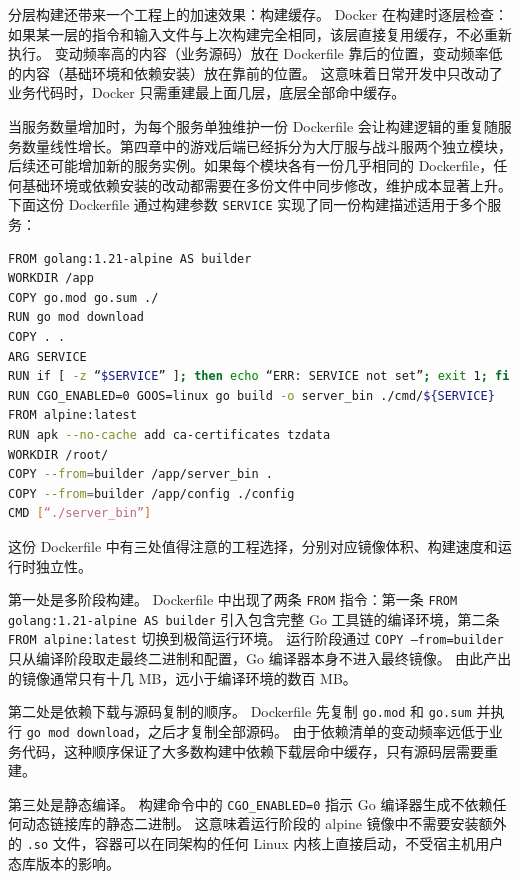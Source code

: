 分层构建还带来一个工程上的加速效果：构建缓存。
Docker 在构建时逐层检查：如果某一层的指令和输入文件与上次构建完全相同，该层直接复用缓存，不必重新执行。
变动频率高的内容（业务源码）放在 Dockerfile 靠后的位置，变动频率低的内容（基础环境和依赖安装）放在靠前的位置。
这意味着日常开发中只改动了业务代码时，Docker 只需重建最上面几层，底层全部命中缓存。

当服务数量增加时，为每个服务单独维护一份 Dockerfile 会让构建逻辑的重复随服务数量线性增长。第四章中的游戏后端已经拆分为大厅服与战斗服两个独立模块，后续还可能增加新的服务实例。如果每个模块各有一份几乎相同的 Dockerfile，任何基础环境或依赖安装的改动都需要在多份文件中同步修改，维护成本显著上升。
下面这份 Dockerfile 通过构建参数 \texttt{SERVICE} 实现了同一份构建描述适用于多个服务：

\begin{tcolorbox}[title=通用Dockerfile：多阶段构建]
\begin{lstlisting}[style=codeblock, language=bash]
FROM golang:1.21-alpine AS builder
WORKDIR /app
COPY go.mod go.sum ./
RUN go mod download
COPY . .
ARG SERVICE
RUN if [ -z “$SERVICE” ]; then echo “ERR: SERVICE not set”; exit 1; fi
RUN CGO_ENABLED=0 GOOS=linux go build -o server_bin ./cmd/${SERVICE}
FROM alpine:latest
RUN apk --no-cache add ca-certificates tzdata
WORKDIR /root/
COPY --from=builder /app/server_bin .
COPY --from=builder /app/config ./config
CMD [“./server_bin”]
\end{lstlisting}
\end{tcolorbox}

这份 Dockerfile 中有三处值得注意的工程选择，分别对应镜像体积、构建速度和运行时独立性。

第一处是多阶段构建。
Dockerfile 中出现了两条 \texttt{FROM} 指令：第一条 \texttt{FROM golang:1.21-alpine AS builder} 引入包含完整 Go 工具链的编译环境，第二条 \texttt{FROM alpine:latest} 切换到极简运行环境。
运行阶段通过 \texttt{COPY --from=builder} 只从编译阶段取走最终二进制和配置，Go 编译器本身不进入最终镜像。
由此产出的镜像通常只有十几 MB，远小于编译环境的数百 MB。

第二处是依赖下载与源码复制的顺序。
Dockerfile 先复制 \texttt{go.mod} 和 \texttt{go.sum} 并执行 \texttt{go mod download}，之后才复制全部源码。
由于依赖清单的变动频率远低于业务代码，这种顺序保证了大多数构建中依赖下载层命中缓存，只有源码层需要重建。

第三处是静态编译。
构建命令中的 \texttt{CGO\_ENABLED=0} 指示 Go 编译器生成不依赖任何动态链接库的静态二进制。
这意味着运行阶段的 alpine 镜像中不需要安装额外的 \texttt{.so} 文件，容器可以在同架构的任何 Linux 内核上直接启动，不受宿主机用户态库版本的影响。

